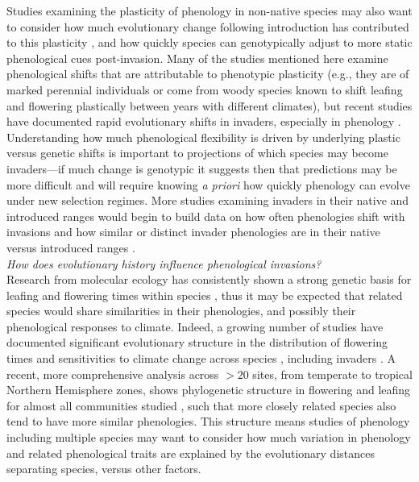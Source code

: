 \documentclass[11pt,a4paper,oneside]{article}
\begin{document}
Studies examining the plasticity of phenology in non-native species may also want to consider how much evolutionary change following introduction has contributed to this plasticity \citep[e.g.,][]{sultan2013}, and how quickly species can genotypically adjust to more static phenological cues post-invasion. Many of the studies mentioned here examine phenological shifts that are attributable to phenotypic plasticity (e.g., they are of marked perennial individuals or come from woody species known to shift leafing and flowering plastically between years with different climates), but recent studies have documented rapid evolutionary shifts in invaders, especially in phenology \citep[e.g.,][]{Colautti:2011,konarz2012,novy2012}. Understanding how much phenological flexibility is driven by underlying plastic versus genetic shifts is important to projections of which species may become invaders---if much change is genotypic it suggests then that predictions may be more difficult and will require knowing \emph{a priori} how quickly phenology can evolve under new selection regimes. More studies examining invaders in their native and introduced ranges \citep[e.g.,][]{Godoy:2009dz,matesanz2012} would begin to build data on how often phenologies shift with invasions and how similar or distinct invader phenologies are in their native versus introduced ranges \citep[e.g.,][]{wolkovichAmBot2013}.\\

\noindent \emph{How does evolutionary history influence phenological invasions?}\\ 
\noindent  Research from molecular ecology has consistently shown a strong genetic basis for leafing and flowering times within species \citep{Howe:2003,arabid2011}, thus it may be expected that related species would share similarities in their phenologies, and possibly their phenological responses to climate. Indeed, a growing number of studies have documented significant evolutionary structure in the distribution of flowering times and sensitivities to climate change across species \citep{Davis:2010ls}, including invaders \citep{Willis:2010al,wolkovichAmBot2013}. A recent, more comprehensive analysis across \(>20\) sites, from temperate to tropical Northern Hemisphere zones, shows phylogenetic structure in flowering and leafing for almost all communities studied \citep{phenophylo}, such that more closely related species also tend to have more similar phenologies. This structure means studies of phenology including multiple species may want to consider how much variation in phenology and related phenological traits are explained by the evolutionary distances separating species, versus other factors.
\end{document}
